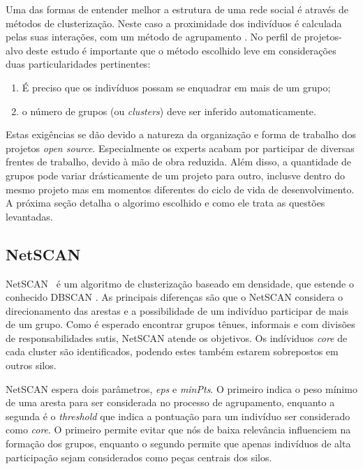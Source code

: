 \documentclass[12pt,openany,oneside,a4paper,english,brazil]{abntbibufjf}
\begin{document}
  Uma das formas de entender melhor a estrutura de uma rede social é através de métodos de clusterização.  Neste caso a proximidade dos indivíduos é calculada pelas suas interações, com um método de agrupamento \cite{meng2014}. No perfil de projetos-alvo deste estudo é importante que o método escolhido leve em considerações duas particularidades pertinentes:

  \begin{enumerate}
    \item É preciso que os indivíduos possam se enquadrar em mais de um grupo;
    \item o número de grupos (ou \textit{clusters}) deve ser inferido automaticamente.
  \end{enumerate}

  Estas exigências se dão devido a natureza da organização e forma de trabalho dos projetos \textit{open source}. Especialmente os experts acabam por participar de diversas frentes de trabalho, devido à mão de obra reduzida. Além disso, a quantidade de grupos pode variar drásticamente de um projeto para outro, inclusve dentro do mesmo projeto mas em momentos diferentes do ciclo de vida de desenvolvimento. A próxima seção detalha o algorimo escolhido e como ele trata as questões levantadas.

  \subsection{NetSCAN}\label{subsec:netscan}

  NetSCAN~\cite{horta2018} é um algoritmo de clusterização baseado em densidade, que estende o conhecido DBSCAN \cite{ester1996}. As principais diferenças são que o NetSCAN considera o direcionamento das arestas e a possibilidade de um indivíduo participar de mais de um grupo. Como é esperado encontrar grupos tênues, informais e com divisões de responsabilidades sutis, NetSCAN atende os objetivos. Os indíviduos \textit{core} de cada cluster são identificados, podendo estes também estarem sobrepostos em outros silos.



  NetSCAN espera dois parâmetros, \textit{eps} e \textit{minPts}. O primeiro indica o peso mínimo de uma aresta para ser considerada no processo de agrupamento, enquanto a segunda é o \textit{threshold} que indica a pontuação para um indivíduo ser considerado como \textit{core}. O primeiro permite evitar que nós de baixa relevância influenciem na formação dos grupos, enquanto o segundo permite que apenas indivíduos de alta participação sejam considerados como peças centrais dos silos.
\end{document}
